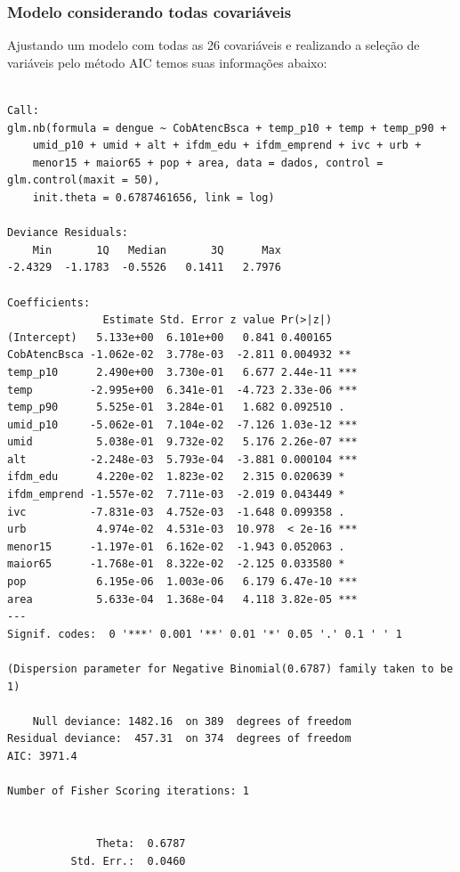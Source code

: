 \documentclass[12pt,a4paper]{article}\usepackage[]{graphicx}\usepackage[]{color}
\makeatletter
\newenvironment{kframe}{%
 \def\at@end@of@kframe{}%
 \ifinner\ifhmode%
  \def\at@end@of@kframe{\end{minipage}}%
  \begin{minipage}{\columnwidth}%
 \fi\fi%
 \def\FrameCommand##1{\hskip\@totalleftmargin \hskip-\fboxsep
 \colorbox{shadecolor}{##1}\hskip-\fboxsep
     \hskip-\linewidth \hskip-\@totalleftmargin \hskip\columnwidth}%
 \MakeFramed {\advance\hsize-\width
   \@totalleftmargin\z@ \linewidth\hsize
   \@setminipage}}%
 {\par\unskip\endMakeFramed%
 \at@end@of@kframe}
\newenvironment{knitrout}{}{} %
\makeatother
\begin{document}
\subsubsection{\textbf{Modelo considerando todas covariáveis}}
Ajustando um modelo com todas as 26 covariáveis e realizando a seleção de variáveis pelo método AIC temos suas informações abaixo:
\begin{knitrout}
\color{fgcolor}\begin{kframe}
\begin{verbatim}

Call:
glm.nb(formula = dengue ~ CobAtencBsca + temp_p10 + temp + temp_p90 + 
    umid_p10 + umid + alt + ifdm_edu + ifdm_emprend + ivc + urb + 
    menor15 + maior65 + pop + area, data = dados, control = glm.control(maxit = 50), 
    init.theta = 0.6787461656, link = log)

Deviance Residuals: 
    Min       1Q   Median       3Q      Max  
-2.4329  -1.1783  -0.5526   0.1411   2.7976  

Coefficients:
               Estimate Std. Error z value Pr(>|z|)    
(Intercept)   5.133e+00  6.101e+00   0.841 0.400165    
CobAtencBsca -1.062e-02  3.778e-03  -2.811 0.004932 ** 
temp_p10      2.490e+00  3.730e-01   6.677 2.44e-11 ***
temp         -2.995e+00  6.341e-01  -4.723 2.33e-06 ***
temp_p90      5.525e-01  3.284e-01   1.682 0.092510 .  
umid_p10     -5.062e-01  7.104e-02  -7.126 1.03e-12 ***
umid          5.038e-01  9.732e-02   5.176 2.26e-07 ***
alt          -2.248e-03  5.793e-04  -3.881 0.000104 ***
ifdm_edu      4.220e-02  1.823e-02   2.315 0.020639 *  
ifdm_emprend -1.557e-02  7.711e-03  -2.019 0.043449 *  
ivc          -7.831e-03  4.752e-03  -1.648 0.099358 .  
urb           4.974e-02  4.531e-03  10.978  < 2e-16 ***
menor15      -1.197e-01  6.162e-02  -1.943 0.052063 .  
maior65      -1.768e-01  8.322e-02  -2.125 0.033580 *  
pop           6.195e-06  1.003e-06   6.179 6.47e-10 ***
area          5.633e-04  1.368e-04   4.118 3.82e-05 ***
---
Signif. codes:  0 '***' 0.001 '**' 0.01 '*' 0.05 '.' 0.1 ' ' 1

(Dispersion parameter for Negative Binomial(0.6787) family taken to be 1)

    Null deviance: 1482.16  on 389  degrees of freedom
Residual deviance:  457.31  on 374  degrees of freedom
AIC: 3971.4

Number of Fisher Scoring iterations: 1


              Theta:  0.6787 
          Std. Err.:  0.0460 


\end{verbatim}
\end{kframe}
\end{knitrout}
\end{document}
